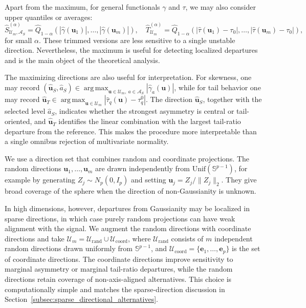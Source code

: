 \documentclass[11pt]{article}
\theoremstyle{plain}
\theoremstyle{definition}
\theoremstyle{remark}
\def\u{\bm{u}}
\newcommand{\abs}[1]{\left\lvert #1 \right\rvert}
\DeclareMathOperator*{\argmax}{arg\,max}
\begin{document}
Apart from the maximum, for general functionals \(\gamma\) and \(\tau\), we may also consider upper quantiles or averages:
\begin{equation*}
    \widehat S_{\mathcal U_m,\mathcal A_S}^{(\alpha)} = \widehat Q_{1-\alpha} \left( \abs{\widehat\gamma(\u_1)}, \ldots ,\abs{\widehat\gamma(\u_m)} \right), \quad
    \widehat T_{\mathcal U_m}^{(\alpha)} = \widehat Q_{1-\alpha} \left(\abs{\widehat\tau(\u_1)-\tau_{0}},\ldots, \abs{\widehat\tau(\u_m)-\tau_{0}} \right),
\end{equation*}
for small \(\alpha\). These trimmed versions are less sensitive to a single unstable direction. Nevertheless, the maximum is useful for detecting localized departures and is the main object of the theoretical analysis.

The maximizing directions are also useful for interpretation. For skewness, one may record \((\widehat{\u}_S,\widehat a_S)\in\argmax_{\u\in\mathcal U_m,\ a\in\mathcal A_S}|\widehat\gamma_{a}(\u)|\), while for tail behavior one may record \(\widehat{\u}_T\in\argmax_{\u\in\mathcal U_m}|\widehat\tau_q(\u)-\tau_q^0|\). The direction \(\widehat{\u}_S\), together with the selected level \(\widehat a_S\), indicates whether the strongest asymmetry is central or tail-oriented, and \(\widehat{\u}_T\) identifies the linear combination with the largest tail-ratio departure from the reference. This makes the procedure more interpretable than a single omnibus rejection of multivariate normality.

We use a direction set that combines random and coordinate projections. The random directions \(\u_1,\ldots,\u_m\) are drawn independently from \(\mathrm{Unif}(\mathbb S^{p-1})\), for example by generating \(Z_j\sim N_p(0,I_p)\) and setting \(\u_j=Z_j/\|Z_j\|_2\). They give broad coverage of the sphere when the direction of non-Gaussianity is unknown.

In high dimensions, however, departures from Gaussianity may be localized in sparse directions, in which case purely random projections can have weak alignment with the signal. We augment the random directions with coordinate directions and take
\(\mathcal U_m = \mathcal U_{\mathrm{rand}} \cup \mathcal U_{\mathrm{coord}}\), where \(\mathcal U_{\mathrm{rand}}\) consists of $m$ independent random directions drawn uniformly from \(\mathbb S^{p-1}\), and \(\mathcal U_{\mathrm{coord}}=\{\bm{e}_1,\ldots,\bm{e}_p\}\) is the set of coordinate directions. The coordinate directions improve sensitivity to marginal asymmetry or marginal tail-ratio departures, while the random directions retain coverage of non-axis-aligned alternatives. This choice is computationally simple and matches the sparse-direction discussion in Section~\ref{subsec:sparse_directional_alternatives}.
\end{document}
